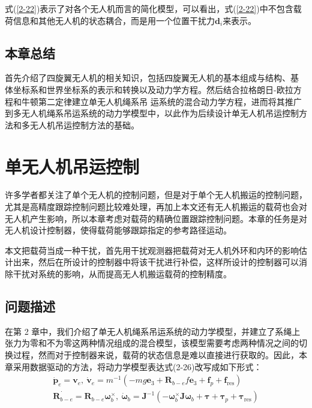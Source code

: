 \documentclass[lang=chs, degree=master, blindreview=false, winfonts=true]{yanputhesis}
\begin{document}
式(\ref{2-22})表示了对各个无人机而言的简化模型，可以看出，式(\ref{2-22})中不包含载荷信息和其他无人机的状态耦合，而是用一个位置干扰力$\boldsymbol{d}_{i}$来表示。

\section{本章总结}
首先介绍了四旋翼无人机的相关知识，包括四旋翼无人机的基本组成与结构、基
体坐标系和世界坐标系的表示和转换以及动力学方程。然后结合拉格朗日-欧拉方程和牛顿第二定律建立单无人机绳系吊
运系统的混合动力学方程，进而将其推广到多无人机绳系吊运系统的动力学模型中，以此作为后续设计单无人机吊运控制方法和多无人机吊运控制方法的基础。
\cleardoublepage

\chapter{单无人机吊运控制}

许多学者都关注了单个无人机的控制问题，但是对于单个无人机搬运的控制问题，尤其是高精度跟踪控制问题比较难处理，再加上本文还有无人机搬运的载荷也会对无人机产生影响，所以本章考虑对载荷的精确位置跟踪控制问题。本章的任务是对无人机设计控制器，使得载荷能够跟踪指定的参考路径运动。 

本文把载荷当成一种干扰，首先用干扰观测器把载荷对无人机外环和内环的影响估计出来，然后在所设计的控制器中将该干扰进行补偿，这样所设计的控制器可以消除干扰对系统的影响，从而提高无人机搬运载荷的控制精度。

\section{问题描述}
在第 2 章中，我们介绍了单无人机绳系吊运系统的动力学模型，并建立了系绳上张力为零和不为零这两种情况组成的混合模型，该模型需要考虑两种情况之间的切换过程，然而对于控制器来说，载荷的状态信息是难以直接进行获取的。因此，本章采用数据驱动的方法，将动力学模型表达式(2-26)改写成如下形式：
\begin{equation}
	\begin{aligned}
		\dot{\boldsymbol{p}}_e = \boldsymbol{v}_e, \
		\dot{\boldsymbol{v}}_e = m^{-1}\left(-mg\bm{e}_3+\boldsymbol{R}_{b-e}f\bm{e}_3+\bm{f}_p+\bm{f}_{\text{res}}\right) \\
		\dot{\bm{R}_{b-e}} = \bm{R}_{b-e} \bm{\omega}_b^{\times}, \
		\dot{\boldsymbol{\omega}}_b = \boldsymbol{J}^{-1}\left(-\bm{\omega}_b^{\times}\bm{J} \bm{\omega}_b+\boldsymbol{\tau}+ \bm{\tau}_p+ \bm{\tau}_{\text{res}}\right)
	\end{aligned}\label{3-1}
\end{equation}
\end{document}
